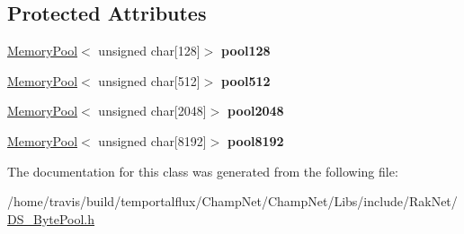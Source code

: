 \subsection*{Protected Attributes}
\begin{DoxyCompactItemize}
\item 
\hypertarget{class_data_structures_1_1_byte_pool_a9f8b53fbf7656990b1394b23640c49c4}{\hyperlink{class_data_structures_1_1_memory_pool}{Memory\-Pool}$<$ unsigned char\mbox{[}128\mbox{]}$>$ {\bfseries pool128}}\label{class_data_structures_1_1_byte_pool_a9f8b53fbf7656990b1394b23640c49c4}

\item 
\hypertarget{class_data_structures_1_1_byte_pool_a79738ca5b1e198b07a2f42b903e52a3c}{\hyperlink{class_data_structures_1_1_memory_pool}{Memory\-Pool}$<$ unsigned char\mbox{[}512\mbox{]}$>$ {\bfseries pool512}}\label{class_data_structures_1_1_byte_pool_a79738ca5b1e198b07a2f42b903e52a3c}

\item 
\hypertarget{class_data_structures_1_1_byte_pool_aa342dcec14441134eb4c236fed4ce343}{\hyperlink{class_data_structures_1_1_memory_pool}{Memory\-Pool}$<$ unsigned char\mbox{[}2048\mbox{]}$>$ {\bfseries pool2048}}\label{class_data_structures_1_1_byte_pool_aa342dcec14441134eb4c236fed4ce343}

\item 
\hypertarget{class_data_structures_1_1_byte_pool_a031434fb036ed4546d3b6bae0de7ea17}{\hyperlink{class_data_structures_1_1_memory_pool}{Memory\-Pool}$<$ unsigned char\mbox{[}8192\mbox{]}$>$ {\bfseries pool8192}}\label{class_data_structures_1_1_byte_pool_a031434fb036ed4546d3b6bae0de7ea17}

\end{DoxyCompactItemize}


The documentation for this class was generated from the following file\-:\begin{DoxyCompactItemize}
\item 
/home/travis/build/temportalflux/\-Champ\-Net/\-Champ\-Net/\-Libs/include/\-Rak\-Net/\hyperlink{_d_s___byte_pool_8h}{D\-S\-\_\-\-Byte\-Pool.\-h}\end{DoxyCompactItemize}
